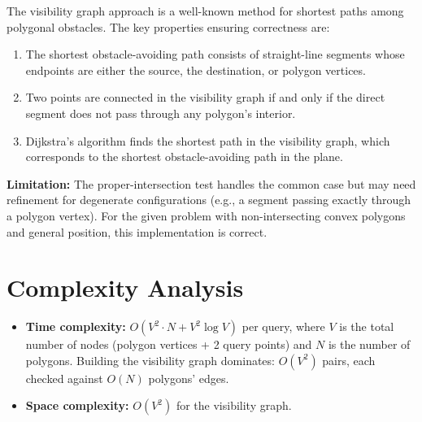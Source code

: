 \documentclass[11pt,a4paper]{article}
\begin{document}
The visibility graph approach is a well-known method for shortest paths among polygonal
obstacles. The key properties ensuring correctness are:

\begin{enumerate}
  \item The shortest obstacle-avoiding path consists of straight-line segments whose
        endpoints are either the source, the destination, or polygon vertices.
  \item Two points are connected in the visibility graph if and only if the direct
        segment does not pass through any polygon's interior.
  \item Dijkstra's algorithm finds the shortest path in the visibility graph, which
        corresponds to the shortest obstacle-avoiding path in the plane.
\end{enumerate}

\textbf{Limitation:} The proper-intersection test handles the common case but may need
refinement for degenerate configurations (e.g., a segment passing exactly through a
polygon vertex). For the given problem with non-intersecting convex polygons and general
position, this implementation is correct.

\section{Complexity Analysis}

\begin{itemize}
  \item \textbf{Time complexity:} $O(V^2 \cdot N + V^2 \log V)$ per query, where $V$
        is the total number of nodes (polygon vertices + 2 query points) and $N$ is the
        number of polygons. Building the visibility graph dominates: $O(V^2)$ pairs, each
        checked against $O(N)$ polygons' edges.
  \item \textbf{Space complexity:} $O(V^2)$ for the visibility graph.
\end{itemize}
\end{document}
